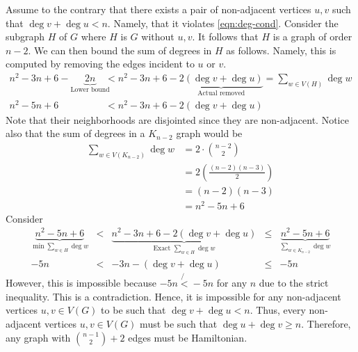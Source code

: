 \documentclass{article}
\begin{document}
\begin{enumerate}
{      Assume to the contrary that there exists a pair of non-adjacent vertices
      \(u, v\) such that \(\deg v + \deg u < n\). Namely, that it violates 
      \ref{eqn:deg-cond}. Consider the 
      subgraph \(H\) of \(G\) where \(H\) is \(G\) without \(u, v\).
      It follows that \(H\) is a graph of order \(n-2\). We
      can then bound the sum of degrees in \(H\) as follows. Namely, this is
      computed by removing the edges incident to \(u\) or \(v\). 
      \[
        \begin{aligned}
          n^2 - 3n + 6 - \underbrace{2n}_\text{Lower bound}
            &< n^2 - 3n + 6 - \underbrace{2(\deg v + \deg u)}_\text{Actual
            removed} = \sum_{w \in V(H)} \deg w \\ 
          n^2 - 5n + 6 &< n^2 - 3n + 6 - 2(\deg v + \deg u)
        \end{aligned}
      \]
      Note that their neighborhoods are disjointed since they are non-adjacent.
      Notice also that the sum of degrees in a \(K_{n-2}\) graph would be 
      \[
        \begin{aligned}
          \sum_{w \in V(K_{n-2})} \deg w
            &= 2 \cdot \binom{n-2}{2} \\ 
            &= 2 \left(\frac{(n-2)(n-3)}{2}\right) \\ 
            &= (n-2)(n-3) \\ 
            &= n^2 - 5n + 6
        \end{aligned}
      \]
      Consider
      \[
        \begin{aligned}
          \underbrace{n^2 - 5n + 6}_{\min \sum_{w \in H} \deg w}
            &<& \underbrace{n^2 - 3n + 6 - 2(\deg v + \deg u)}_\text{Exact
            \(\sum_{w \in H} \deg w\)}
            &\leq& \underbrace{n^2 - 5n + 6}_{\sum_{w \in K_{n-2}} \deg w} \\ 
          -5n &<& -3n - (\deg v + \deg u) &\leq& - 5n
        \end{aligned}
      \]
      However, this is impossible because \(-5n \not{<} -5n\) for any \(n\) due
      to the strict inequality.
      This is a contradiction. Hence, it is impossible for any non-adjacent
      vertices \(u, v \in V(G)\) to be such that \(\deg v + \deg u < n\).
      Thus, every non-adjacent vertices \(u, v \in V(G)\) must be such that
      \(\deg u + \deg v \geq n\). Therefore, any graph with \(\binom{n-1}{2} +
      2\) edges must be Hamiltonian.
    }
\end{enumerate}

% 
% 
\end{document}

